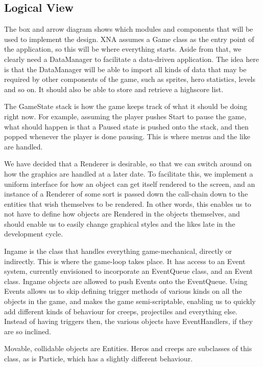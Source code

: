 \subsection{Logical View}

The box and arrow diagram shows which modules and components that will be
used to implement the design. XNA assumes a Game class as the entry point of
the application, so this will be where everything starts. Aside from that,
we clearly need a DataManager to facilitate a data-driven application. The
idea here is that the DataManager will be able to import all kinds of data that
may be required by other components of the game, such as sprites, hero statistics,
levels and so on. It should also be able to store and retrieve a highscore list.

The GameState stack is how the game keeps track of what it should be doing right
now. For example, assuming the player pushes Start to pause the game, what should
happen is that a Paused state is pushed onto the stack, and then popped whenever
the player is done pausing. This is where menus and the like are handled.

We have decided that a Renderer is desirable, so that we can switch around on how
the graphics are handled at a later date. To facilitate this, we implement a
uniform interface for how an object can get itself rendered to the screen, and
an instance of a Renderer of some sort is passed down the call-chain down to the
entities that wish themselves to be rendered. In other words, this enables us to
not have to define how objects are Rendered in the objects themselves, and should
enable us to easily change graphical styles and the likes late in the development
cycle.

Ingame is the class that handles everything game-mechanical, directly or
indirectly. This is where the game-loop takes place. It has access to an Event
system, currently envisioned to incorporate an EventQueue class, and an Event
class. Ingame objects are allowed to push Events onto the EventQueue. Using
Events allows us to skip defining trigger methods of various kinds on all the
objects in the game, and makes the game semi-scriptable, enabling us to quickly
add different kinds of behaviour for creeps, projectiles and everything else.
Instead of having triggers then, the various objects have EventHandlers, if
they are so inclined.

Movable, collidable objects are Entities. Heros and creeps are subclasses
of this class, as is Particle, which has a slightly different behaviour.
